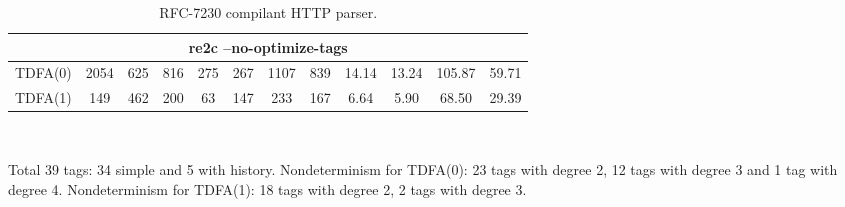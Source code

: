 \documentclass{article}
\theoremstyle{definition}
\begin{document}
\begin{multicols}{2}
\begin{table}
\begin{center}
\begin{tabular}{|c|ccccccccccc|}
    \hline \hline
    \multicolumn{12}{|c|}{re2c --no-optimize-tags} \\
    \hline
    TDFA(0) & 2054 & 625 & 816 & 275 & 267 & 1107 & 839 & 14.14 & 13.24 & 105.87 & 59.71 \\
    TDFA(1) &  149 & 462 & 200 &  63 & 147 &  233 & 167 &  6.64 &  5.90 &  68.50 & 29.39 \\
    \hline
    \end{tabular}\\
    \caption{RFC-7230 compilant HTTP parser.}
    \smallskip
    \footnotesize{Total 39 tags: 34 simple and 5 with history.
    Nondeterminism for TDFA(0): 23 tags with degree 2, 12 tags with degree 3 and 1 tag with degree 4.
    Nondeterminism for TDFA(1): 18 tags with degree 2, 2 tags with degree 3.}
\end{center}
\end{table}




\end{multicols}
\end{document}
